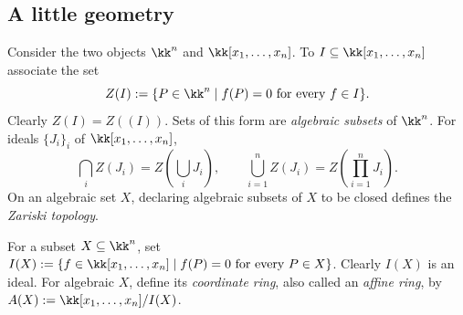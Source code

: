 \documentclass[11pt,a4paper]{article}
\begin{document}
\subsection{A little geometry}
Consider the two objects $\kk^n$ and $\kk[x_1,\ldots,x_n]$. To $I\subseteq\kk[x_1,\ldots,x_n]$ associate the set
\[Z(I):=\{P\in\kk^n\mid f(P)=0\text{ for every }f\in I\}.\]
Clearly $Z(I)=Z((I))$. Sets of this form are \emph{algebraic subsets} of $\kk^n$. For ideals $\{J_i\}_i$ of $\kk[x_1,\ldots,x_n]$,
\[
\bigcap_i Z(J_i)=Z\left(\bigcup_i J_i\right),\qquad
\bigcup_{i=1}^n Z(J_i)=Z\left(\prod_{i=1}^n J_i\right).
\]
On an algebraic set $X$, declaring algebraic subsets of $X$ to be closed defines the \emph{Zariski topology}.

For a subset $X\subseteq\kk^n$, set $I(X):=\{f\in\kk[x_1,\ldots,x_n]\mid f(P)=0\text{ for every }P\in X\}$. Clearly $I(X)$ is an ideal. For algebraic $X$, define its \emph{coordinate ring}, also called an \emph{affine ring}, by $A(X):=\kk[x_1,\ldots,x_n]/I(X)$.
\end{document}
